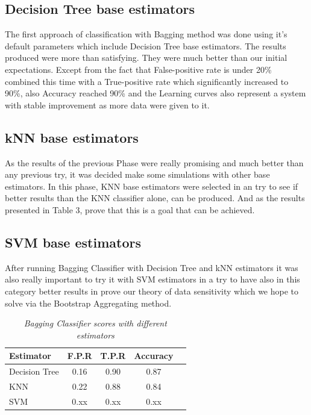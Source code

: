 \documentclass[10pt, conference, compsocconf]{IEEEtran}
\begin{document}
\subsection{Decision Tree base estimators}

The first approach of classification with Bagging method was done using it's default parameters which include Decision Tree base estimators. The results produced were more than satisfying. They were much better than our initial expectations. Except from the fact that False-positive rate is under 20\% combined this time with a True-positive rate which significantly increased to 90\%, also Accuracy reached 90\% and the Learning curves also represent a system with stable improvement as more data were given to it. 

\subsection{kNN base estimators} 

As the results of the previous Phase were really promising and much better than any previous try, it was decided make some simulations with other base estimators. In this phase, KNN base estimators were selected in an try to see if better results than the KNN classifier alone, can be produced. And as the results presented in Table 3, prove that this is a goal that can be achieved.  

\subsection{SVM base estimators}

After running Bagging Classifier with Decision Tree and kNN estimators it was also really important to try it with SVM estimators in a try to have also in this category better results in prove our theory of data sensitivity which we hope to solve via the Bootstrap Aggregating method. 

\begin{table}[hb]
\caption{\it Bagging Classifier scores with different estimators}
\vskip 0.1in
\begin{center}
\begin{small}
\begin{sc}
\begin{tabular}{|l|c|c|c|r|}
\hline
Estimator & F.P.R & T.P.R & Accuracy\\
\hline
Decision Tree & 0.16 & 0.90 & 0.87 \\
\hline
KNN & 0.22 & 0.88 & 0.84 \\
\hline
SVM & 0.xx & 0.xx & 0.xx \\
\hline
\end{tabular}
\end{sc}
\end{small}
\end{center}
\vskip -0.2in
\end{table}
\end{document}

